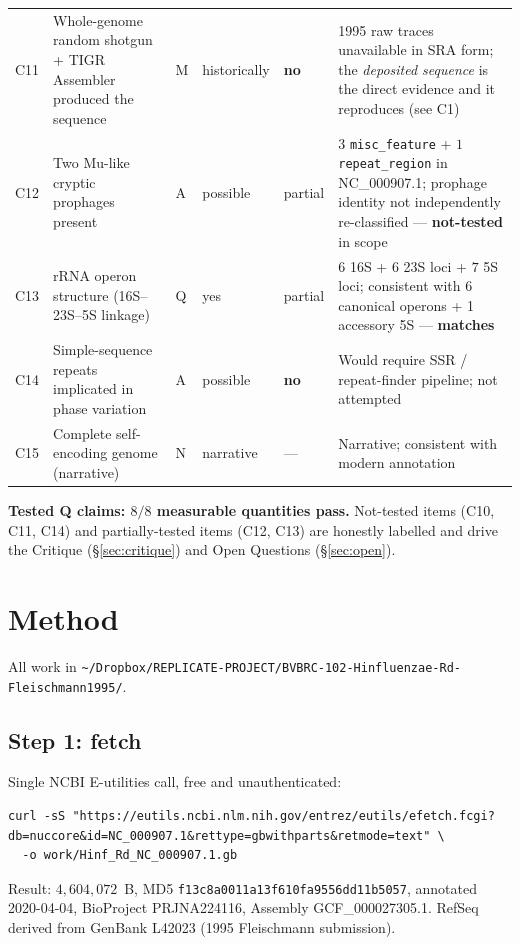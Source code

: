 \documentclass[10pt]{article}
\begin{document}
{\begin{longtable}{@{}p{}p{}p{}p{}p{}p{}@{}}
C11 & Whole-genome random shotgun + TIGR Assembler produced the sequence & M & historically & \textbf{no}  & 1995 raw traces unavailable in SRA form; the \emph{deposited sequence} is the direct evidence and it reproduces (see C1) \\
C12 & Two Mu-like cryptic prophages present                             & A & possible       & partial & $3$ \texttt{misc\_feature} + $1$ \texttt{repeat\_region} in NC\_000907.1; prophage identity not independently re-classified --- \textbf{not-tested} in scope \\
C13 & rRNA operon structure (16S--23S--5S linkage)                      & Q & yes            & partial & $6$ 16S + $6$ 23S loci + $7$ 5S loci; consistent with 6 canonical operons + 1 accessory 5S --- \textbf{matches} \\
C14 & Simple-sequence repeats implicated in phase variation             & A & possible       & \textbf{no}  & Would require SSR / repeat-finder pipeline; not attempted \\
C15 & Complete self-encoding genome (narrative)                         & N & narrative      & ---     & Narrative; consistent with modern annotation \\
\bottomrule
\end{longtable}}

\noindent\textbf{Tested Q claims: $8/8$ measurable quantities pass.} Not-tested items (C10, C11,
C14) and partially-tested items (C12, C13) are honestly labelled and drive the Critique
(\S\ref{sec:critique}) and Open Questions (\S\ref{sec:open}).

\section{Method}
\label{sec:method}

All work in \texttt{\textasciitilde/Dropbox/REPLICATE-PROJECT/BVBRC-102-Hinfluenzae-Rd-Fleischmann1995/}.

\subsection*{Step 1: fetch}
Single NCBI E-utilities call, free and unauthenticated:
\begin{lstlisting}
curl -sS "https://eutils.ncbi.nlm.nih.gov/entrez/eutils/efetch.fcgi?db=nuccore&id=NC_000907.1&rettype=gbwithparts&retmode=text" \
  -o work/Hinf_Rd_NC_000907.1.gb
\end{lstlisting}
Result: $4{,}604{,}072$~B, MD5 \texttt{f13c8a0011a13f610fa9556dd11b5057}, annotated 2020-04-04,
BioProject PRJNA224116, Assembly GCF\_000027305.1. RefSeq derived from GenBank L42023
(1995 Fleischmann submission).
\end{document}
